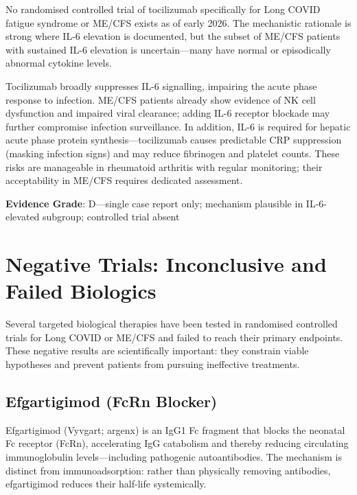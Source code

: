 No randomised controlled trial of tocilizumab specifically for Long COVID fatigue syndrome or ME/CFS exists as of early 2026. The mechanistic rationale is strong where IL-6 elevation is documented, but the subset of ME/CFS patients with sustained IL-6 elevation is uncertain---many have normal or episodically abnormal cytokine levels.

\begin{warning}
Tocilizumab broadly suppresses IL-6 signalling, impairing the acute phase response to infection. ME/CFS patients already show evidence of NK cell dysfunction and impaired viral clearance; adding IL-6 receptor blockade may further compromise infection surveillance. In addition, IL-6 is required for hepatic acute phase protein synthesis---tocilizumab causes predictable CRP suppression (masking infection signs) and may reduce fibrinogen and platelet counts. These risks are manageable in rheumatoid arthritis with regular monitoring; their acceptability in ME/CFS requires dedicated assessment.
\end{warning}

\textbf{Evidence Grade}: D---single case report only; mechanism plausible in IL-6-elevated subgroup; controlled trial absent

\section{Negative Trials: Inconclusive and Failed Biologics}
\label{sec:negative-trials}

Several targeted biological therapies have been tested in randomised controlled trials for Long COVID or ME/CFS and failed to reach their primary endpoints. These negative results are scientifically important: they constrain viable hypotheses and prevent patients from pursuing ineffective treatments.

\subsection{Efgartigimod (FcRn Blocker)}
\label{subsec:efgartigimod}

Efgartigimod (Vyvgart; argenx) is an IgG1 Fc fragment that blocks the neonatal Fc receptor (FcRn), accelerating IgG catabolism and thereby reducing circulating immunoglobulin levels---including pathogenic autoantibodies. The mechanism is distinct from immunoadsorption: rather than physically removing antibodies, efgartigimod reduces their half-life systemically.

